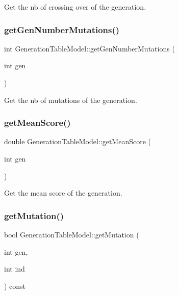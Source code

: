 Get the nb of crossing over of the generation. 

\mbox{\label{class_generation_table_model_a71714de38cb532f42e72e6bb7c757243}} 
\subsubsection{\texorpdfstring{get\+Gen\+Number\+Mutations()}{getGenNumberMutations()}}
{\footnotesize\ttfamily int Generation\+Table\+Model\+::get\+Gen\+Number\+Mutations (\begin{DoxyParamCaption}\item[{int}]{gen }\end{DoxyParamCaption})}



Get the nb of mutations of the generation. 

\mbox{\label{class_generation_table_model_ae2feb02d1d61e5a2d199c6b766334613}} 
\subsubsection{\texorpdfstring{get\+Mean\+Score()}{getMeanScore()}}
{\footnotesize\ttfamily double Generation\+Table\+Model\+::get\+Mean\+Score (\begin{DoxyParamCaption}\item[{int}]{gen }\end{DoxyParamCaption})}



Get the mean score of the generation. 

\mbox{\label{class_generation_table_model_a967452056ba563c77369bfbec87e8cec}} 
\subsubsection{\texorpdfstring{get\+Mutation()}{getMutation()}}
{\footnotesize\ttfamily bool Generation\+Table\+Model\+::get\+Mutation (\begin{DoxyParamCaption}\item[{int}]{gen,  }\item[{int}]{ind }\end{DoxyParamCaption}) const}



